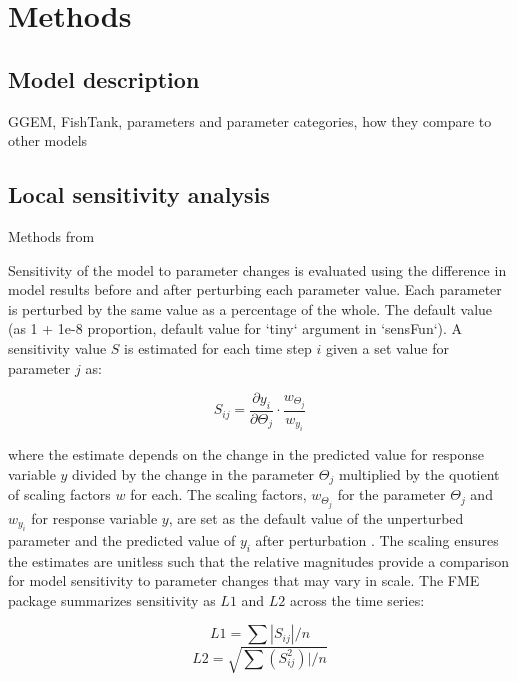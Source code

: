 \documentclass[letterpaper,12pt,oneside]{article}\usepackage[]{graphicx}\usepackage[]{color}
\begin{document}
\section{Methods}

\subsection{Model description}

GGEM, FishTank, parameters and parameter categories, how they compare to other models

\subsection{Local sensitivity analysis}

Methods from \cite{Reichert01,Soetaert10}

Sensitivity of the model to parameter changes is evaluated using the difference in model results before and after perturbing each parameter value.  Each parameter is perturbed by the same value as a percentage of the whole.  The default value (as 1 + 1e-8 proportion, default value for `tiny` argument in `sensFun`).  A sensitivity value $S$ is estimated for each time step $i$ given a set value for parameter $j$ as:

\begin{equation}
S_{ij} = \frac{\partial y_i}{\partial \Theta_j}\cdot\frac{w_{\Theta_j}}{w_{y_i}}
\end{equation}

where the estimate depends on the change in the predicted value for response variable $y$ divided by the change in the parameter $\Theta_j$ multiplied by the quotient of scaling factors $w$ for each.  The scaling factors, $w_{\Theta_j}$ for the parameter $\Theta_j$ and $w_{y_i}$ for response variable $y$, are set as the default value of the unperturbed parameter and the predicted value of $y_i$ after perturbation \citep{Soetaert10}.  The scaling ensures the estimates are unitless such that the relative magnitudes provide a comparison for model sensitivity to parameter changes that may vary in scale.  The FME package summarizes sensitivity as $L1$ and $L2$ across the time series:

\begin{equation}
L1 = \sum|S_{ij}|/n
\end{equation}
\begin{equation}
L2 = \sqrt{\sum\left(S_{ij}^2\right)|/n}
\end{equation}
\end{document}
